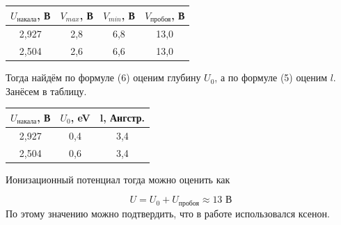 \documentclass[a4paper, 12pt]{article}
\begin{document}
\begin{table}[H]
	\centering
	\begin{tabular}{|c|c|c|c|}
	\hline
	$U_{\text{накала}}$, В & $V_{max}$, В & $V_{min}$, В & $V_{\text{пробоя}}$, В \\ \hline
	2,927               & 2,8        & 6,8        & 13,0               \\ \hline
	2,504               & 2,6        & 6,6        & 13,0               \\ \hline
	\end{tabular}
\end{table}
Тогда найдём по формуле (6) оценим глубину $U_0$, а по формуле (5) оценим $l$. Занёсем в таблицу.
\begin{table}[H]
	\centering
	\begin{tabular}{|c|c|c|}
	\hline
	$U_\text{накала}$, В & $U_0$, eV & l, Ангстр. \\ \hline
	2,927               & 0,4     & 3,4        \\ \hline
	2,504               & 0,6     & 3,4        \\ \hline
	\end{tabular}
\end{table}

Ионизационный потенциал тогда можно оценить как 

\begin{equation}
	U = U_0 + U_{\text{пробоя}} \approx 13 \text{ В}
\end{equation}
По этому значению можно подтвердить, что в работе использовался ксенон.
\end{document}

